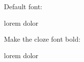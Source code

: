 


{}

Default font:

lorem  dolor

Make the cloze font bold:

\def\clozefont{\bf}

lorem  dolor

\bye
